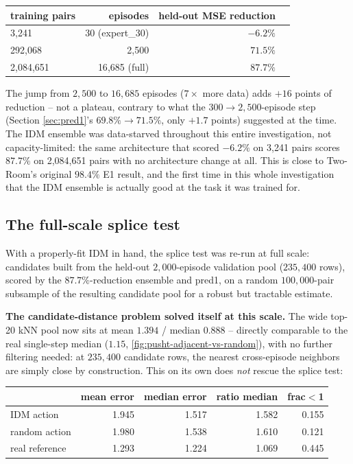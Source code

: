 \documentclass[11pt]{article}
\begin{document}
\begin{center}
\begin{tabular}{@{}lrrr@{}}
\toprule
training pairs & episodes & held-out MSE reduction \\
\midrule
3{,}241     & 30 (expert\_30)     & $-6.2\%$ \\
292{,}068   & 2{,}500             & $71.5\%$ \\
2{,}084{,}651 & 16{,}685 (full)   & $\mathbf{87.7\%}$ \\
\bottomrule
\end{tabular}
\end{center}

The jump from $2{,}500$ to $16{,}685$ episodes ($7\times$ more data) adds $+16$ points of
reduction -- not a plateau, contrary to what the $300\to2{,}500$-episode step (Section
\ref{sec:pred1}'s $69.8\%\to71.5\%$, only $+1.7$ points) suggested at the time. The IDM ensemble
was data-starved throughout this entire investigation, not capacity-limited: the same
architecture that scored $-6.2\%$ on 3{,}241 pairs scores $87.7\%$ on 2{,}084{,}651 pairs with
no architecture change at all. This is close to Two-Room's original $98.4\%$ E1 result, and the
first time in this whole investigation that the IDM ensemble is actually good at the task it
was trained for.

\subsection{The full-scale splice test}
\label{sec:fullscale-splice}

With a properly-fit IDM in hand, the splice test was re-run at full scale: candidates built
from the held-out $2{,}000$-episode validation pool ($235{,}400$ rows), scored by the
$87.7\%$-reduction ensemble and pred1, on a random $100{,}000$-pair subsample of the resulting
candidate pool for a robust but tractable estimate.

\textbf{The candidate-distance problem solved itself at this scale.} The wide top-20 kNN pool
now sits at mean $1.394$ / median $0.888$ -- directly comparable to the real single-step
median ($1.15$, \cref{fig:pusht-adjacent-vs-random}), with no further filtering needed: at
$235{,}400$ candidate rows, the nearest cross-episode neighbors are simply close by
construction. This on its own does \emph{not} rescue the splice test:

\begin{center}
\begin{tabular}{@{}lrrrr@{}}
\toprule
& mean error & median error & ratio median & frac$<$1 \\
\midrule
IDM action     & 1.945 & 1.517 & 1.582 & 0.155 \\
random action  & 1.980 & 1.538 & 1.610 & 0.121 \\
real reference & 1.293 & 1.224 & 1.069 & 0.445 \\
\bottomrule
\end{tabular}
\end{center}
\end{document}
